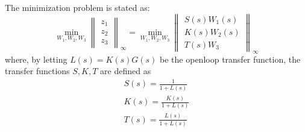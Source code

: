The minimization problem is stated as:
\begin{equation}
	\min_{W_1, W_2, W_3} 
		\begin{Vmatrix}
			z_1 \\ z_2 \\ z_3
		\end{Vmatrix}_\infty
	=
	\min_{W_1, W_2, W_3} 
		\begin{Vmatrix}
			S(s) W_1(s) \\ K(s) W_2(s) \\ T(s) W_3
		\end{Vmatrix}_\infty
\end{equation}
where, by letting $L(s) = K(s)G(s)$ be the openloop transfer function, the transfer functions $S, K, T$ are defined as
\begin{gather}
	S(s) = \frac{1}{1+L(s)} \\
	K(s)=\frac{K(s)}{1+L(s)} \\
	T(s)=\frac{L(s)}{1+L(s)}
\end{gather} 


